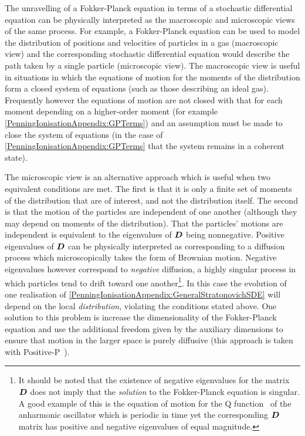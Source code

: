 The unravelling of a Fokker-Planck equation in terms of a stochastic differential equation can be physically interpreted as the macroscopic and microscopic views of the same process. For example, a Fokker-Planck equation can be used to model the distribution of positions and velocities of particles in a gas (macroscopic view) and the corresponding stochastic differential equation would describe the path taken by a single particle (microscopic view). The macroscopic view is useful in situations in which the equations of motion for the moments of the distribution form a closed system of equations (such as those describing an ideal gas). Frequently however the equations of motion are not closed with that for each moment depending on a higher-order moment (for example \eqref{PenningIonisationAppendix:GPTerms}) and an assumption must be made to close the system of equations (in the case of \eqref{PenningIonisationAppendix:GPTerms} that the system remains in a coherent state). 

The microscopic view is an alternative approach which is useful when two equivalent conditions are met. The first is that it is only a finite set of moments of the distribution that are of interest, and not the distribution itself. The second is that the motion of the particles are independent of one another (although they may depend on moments of the distribution). That the particles' motions are independent is equivalent to the eigenvalues of $\bm{D}$ being nonnegative. Positive eigenvalues of $\bm{D}$ can be physically interpreted as corresponding to a diffusion process which microscopically takes the form of Brownian motion. Negative eigenvalues however correspond to \emph{negative} diffusion, a highly singular process in which particles tend to drift toward one another\footnote{It should be noted that the existence of negative eigenvalues for the matrix $\bm{D}$ does not imply that the \emph{solution} to the Fokker-Planck equation is singular. A good example of this is the equation of motion for the Q function~\citep{Scully} of the anharmonic oscillator which is periodic in time yet the corresponding $\bm{D}$ matrix has positive and negative eigenvalues of equal magnitude.}. In this case the evolution of one realisation of \eqref{PenningIonisationAppendix:GeneralStratonovichSDE} will depend on the local \emph{distribution}, violating the conditions stated above. One solution to this problem is increase the dimensionality of the Fokker-Planck equation and use the additional freedom given by the auxiliary dimensions to ensure that motion in the larger space is purely diffusive (this approach is taken with Positive-P~\citep{GardinerQN}). 

